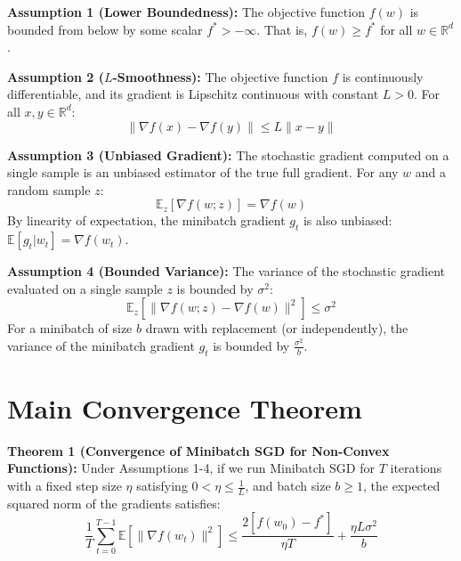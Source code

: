 \documentclass{article}
\begin{document}
\textbf{Assumption 1 (Lower Boundedness):} The objective function $f(w)$ is bounded from below by some scalar $f^* > -\infty$. That is, $f(w) \geq f^*$ for all $w \in \mathbb{R}^d$.

\textbf{Assumption 2 ($L$-Smoothness):} The objective function $f$ is continuously differentiable, and its gradient is Lipschitz continuous with constant $L > 0$. For all $x, y \in \mathbb{R}^d$:
\begin{equation}
    \|\nabla f(x) - \nabla f(y)\| \leq L \|x - y\|
\end{equation}

\textbf{Assumption 3 (Unbiased Gradient):} The stochastic gradient computed on a single sample is an unbiased estimator of the true full gradient. For any $w$ and a random sample $z$:
\begin{equation}
    \mathbb{E}_z[\nabla f(w; z)] = \nabla f(w)
\end{equation}
By linearity of expectation, the minibatch gradient $g_t$ is also unbiased: $\mathbb{E}[g_t | w_t] = \nabla f(w_t)$.

\textbf{Assumption 4 (Bounded Variance):} The variance of the stochastic gradient evaluated on a single sample $z$ is bounded by $\sigma^2$:
\begin{equation}
    \mathbb{E}_z[\|\nabla f(w; z) - \nabla f(w)\|^2] \leq \sigma^2
\end{equation}
For a minibatch of size $b$ drawn with replacement (or independently), the variance of the minibatch gradient $g_t$ is bounded by $\frac{\sigma^2}{b}$.

\section*{Main Convergence Theorem}
\textbf{Theorem 1 (Convergence of Minibatch SGD for Non-Convex Functions):} Under Assumptions 1-4, if we run Minibatch SGD for $T$ iterations with a fixed step size $\eta$ satisfying $0 < \eta \leq \frac{1}{L}$, and batch size $b \geq 1$, the expected squared norm of the gradients satisfies:
\begin{equation}
    \frac{1}{T} \sum_{t=0}^{T-1} \mathbb{E}[\|\nabla f(w_t)\|^2] \leq \frac{2[f(w_0) - f^*]}{\eta T} + \frac{\eta L \sigma^2}{b}
\end{equation}
\end{document}
